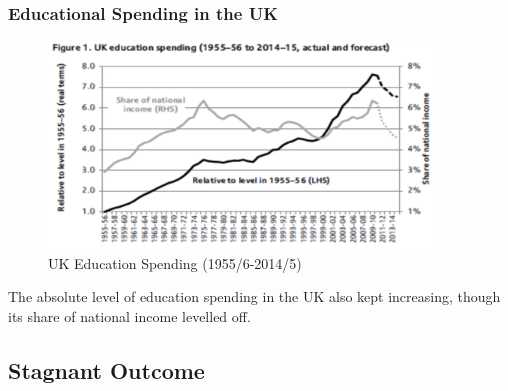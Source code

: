        \subsubsection{Educational Spending in the UK}
            \begin{figure}[H]
                \centering
                \includegraphics[width=4in]{images/ch9/9 uk res 1.png}
                \caption{UK Education Spending (1955/6-2014/5)}
            \end{figure}
            The absolute level of education spending in the UK also kept increasing, though its share of national income levelled off.
            
    
    \subsection{Stagnant Outcome}
        
